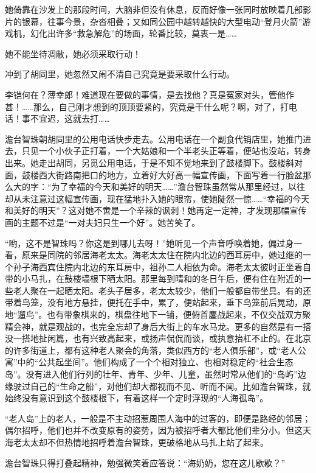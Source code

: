 \par 她倚靠在沙发上的那段时间，大脑非但没有休息，反而好像一张同时放映着几部影片的银幕，往事今景，杂沓相叠；又如同公园中越转越快的大型电动“登月火箭”游戏机，幻化出许多“救急解危”的场面，轮番比较，莫衷一是……
\par 她不能坐待凋敝，她必须采取行动！
\par 冲到了胡同里，她忽然又闹不清自己究竟是要采取什么行动。
\par 李铠何在？薄幸郎！难道现在要做的事情，是去找他？真是冤家对头，管他作甚！……那么，自己刚才想到的顶顶要紧的，究竟是干什么呢？啊，对了，打电话！事不宜迟，这就去打……
\par 澹台智珠朝胡同里的公用电话快步走去。公用电话在一个副食代销店里，她推门进去，只见一个小伙子正打着，一个大姑娘和一个半老头正等着，便站也没站，转身出来。她走出胡同，另觅公用电话，于是不知不觉地来到了鼓楼脚下。鼓楼斜对面，鼓楼西大街路南把口的地方，立着好大好高一幅宣传画，下面写着一行脸盆那么大的字：“为了幸福的今天和美好的明天……”澹台智珠虽然常从那里经过，以往却从未注意过这幅宣传画，现在猛地扑入她的眼帘，使她陡然一惊……“幸福的今天和美好的明天”？这对她不啻是一个辛辣的讽刺！她再定一定神，才发现那幅宣传画的主题不过是“一对夫妇只生一个好”。她苦笑了。
\par “哟，这不是智珠吗？你这是到哪儿去呀！”她听见一个声音呼唤着她，偏过身一看，原来是同院的邻居海老太太。海老太太住在院内北边的西耳房中，她过继的一个孙子海西宾住院内北边的东耳房中，祖孙二人相依为命。海老太太彼时正坐着自带的小马扎，在鼓楼墙根下晒太阳。那里每到晴和的冬日午后，便有住在附近的一些老人聚在一起晒太阳。老头子居多，老太太较少，他们一般都自带坐具。有的还带着鸟笼，没有地方悬挂，便托在手中，累了，便站起来，垂下鸟笼前后晃动，原地“遛鸟”。也有带象棋来的，棋盘往地下一铺，便俯首鏖战起来，不仅交战双方聚精会神，就是观战的，也完全忘却了身后大街上的车水马龙。更多的自然是有一搭没一搭地扯闲篇，也有兴致高起来，或扬声侃侃而谈，或执意抬杠不止的。在北京的许多街道上，都有这种老人聚会的角落，类似西方的“老人俱乐部”，或“老人公寓”中的“公共起坐间”。他们构成了一个个相对独立、也相对稳定的“社会生态岛”。没有进入他们行列的壮年、青年、少年、儿童，虽然时常从他们的“岛屿”边缘驶过自己的“生命之船”，对他们却大都视而不见、听而不闻。比如澹台智珠，就始终没有意识到这个鼓楼根下，有着这样一个定时浮现的“人海孤岛”。
\par “老人岛”上的老人，一般是不主动招惹周围人海中的过客的，即便是路经的邻居；偶尔招呼，他们也并不改变原有的姿势，因为被招呼者大都比他们辈分小。但这天海老太太却不但热情地招呼着澹台智珠，更破格地从马扎上站了起来。
\par 澹台智珠只得打叠起精神，勉强微笑着应答说：“海奶奶，您在这儿歇歇？”
